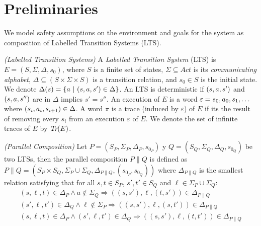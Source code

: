 \section{Preliminaries}

We model safety assumptions on the environment and goals for the system as composition of Labelled Transition Systems (LTS). 


\begin{definition}
	\label{def:LTS} \emph{(Labelled Transition Systems)} 
	A \emph{Labelled Transition System} (LTS) is $E =  (S, \Sigma, \Delta, s_0)$, where $S$ is a finite set of states, $\Sigma \subseteq Act$ is its {\em communicating alphabet}, $\Delta \subseteq (S \times \Sigma \times S)$ is a transition relation, and $s_0 \in S$ is the initial state.  We denote $\Delta(s)=\{a~|~(s,a,s') \in \Delta\}$. 
	An LTS is deterministic if $(s,a,s')$ and $(s,a,s'')$ are in $\Delta$ implies $s'=s''$.
	An execution of $E$ is a word $\varepsilon=s_0, a_0, s_1, \ldots$ where $(s_i, a_i, s_{i+1}) \in \Delta$. 
	A word $\pi$ is a trace (induced by $\varepsilon$) of $E$ if its the result of removing every $s_i$ from an execution $\varepsilon$ of $E$. 
	We denote the set of infinite traces of $E$ by $\emph{Tr}(E)$. 
\end{definition}



\begin{definition}\label{def:parallelComposition}\emph{(Parallel Composition)}
	Let $P=(S_P,\Sigma_P,\Delta_P,s_{0_P})$ y $Q=(S_Q,\Sigma_Q,\Delta_Q,s_{0_Q})$ be two LTSs, then 
	the parallel composition $P\|Q$ is defined as $P \| Q = (S_P \times S_Q, \Sigma_P \cup \Sigma_Q, \Delta_{P\|Q}, (s_{0_P}, s_{0_Q}))$
	where $\Delta_{P\|Q}$ is the smallest relation satisfying that for all $s, t \in S_P$, $s',t' \in S_Q$ and $\ell \in \Sigma_P \cup \Sigma_Q$:
	\small
	\begin{gather*}
	(s,\ell,t) \in \Delta_{P} \wedge a \not\in \Sigma_Q \Rightarrow ((s,s'),\ell,(t,s')) \in \Delta_{P\|Q}\\
	(s',\ell,t') \in \Delta_{Q} \wedge \ell \not\in \Sigma_P \Rightarrow ((s,s'),\ell,(s,t')) \in \Delta_{P\|Q}\\
	(s,\ell,t) \in \Delta_{P} \wedge (s',\ell,t') \in \Delta_{Q} \Rightarrow ((s,s'),\ell,(t,t')) \in \Delta_{P\|Q} 
	\end{gather*}
	\normalsize
\end{definition}

